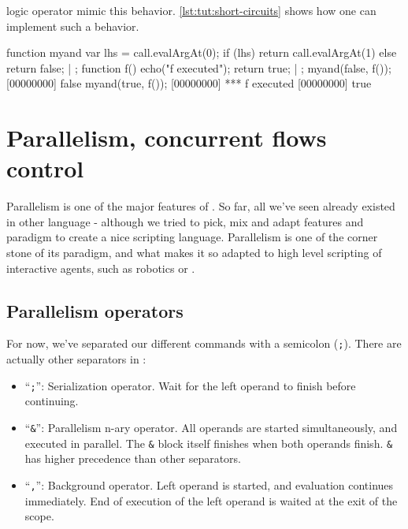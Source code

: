 \us logic operator mimic this behavior. \autoref{lst:tut:short-circuits} shows
how one can implement such a behavior.

\begin{urbiscript}[caption=Implementing logic short circuits,
label=lst:tut:short-circuits]
function myand
{
  var lhs = call.evalArgAt(0);
  if (lhs)
    return call.evalArgAt(1)
  else
    return false;
} | {};
function f()
{
  echo("f executed");
  return true;
} | {};
myand(false, f());
[00000000] false
myand(true, f());
[00000000] *** f executed
[00000000] true
\end{urbiscript}


\chapter{Parallelism, concurrent flows control}

Parallelism is one of the major features of \us. So far, all we've
seen already existed in other language - although we tried to pick,
mix and adapt features and paradigm to create a nice scripting
language. Parallelism is one of the corner stone of its paradigm, and
what makes it so adapted to high level scripting of interactive
agents, such as robotics or \ai.

\section{Parallelism operators}

For now, we've separated our different commands with a semicolon
(\lstinline{;}). There are actually other separators in \us:

\begin{itemize}
\item ``\lstinline{;}'': Serialization operator. Wait for the left
  operand to finish before continuing.
\item ``\lstinline{&}'': Parallelism n-ary operator. All operands are
  started simultaneously, and executed in parallel. The \lstinline{&}
  block itself finishes when both operands finish. \lstinline{&} has
  higher precedence than other separators.
\item ``\lstinline{,}'': Background operator. Left operand is started,
  and evaluation continues immediately. End of execution of the left
  operand is waited at the exit of the scope.
\end{itemize}

